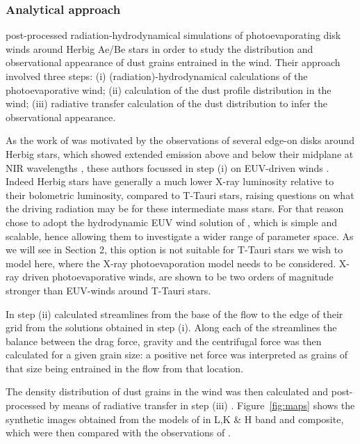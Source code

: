 \documentclass[10pt,fleqn,twoside]{article}
\begin{document}
\subsubsection{Analytical approach}\label{sec:analytical-approach}

\citet{2011MNRAS.411.1104O} post-processed
radiation-hydrodynamical simulations of photoevaporating disk winds
around Herbig Ae/Be stars in order to study the distribution and
observational appearance of dust grains entrained in the wind. Their
approach involved three steps: (i) (radiation)-hydrodynamical
calculations of the photoevaporative wind; (ii) calculation of the
dust profile distribution in the wind; (iii) radiative transfer
calculation of the dust distribution to infer the observational
appearance. 

As the work of \citet{2011MNRAS.411.1104O} was motivated by the
observations of several edge-on disks around Herbig stars, which
showed extended emission above and below their midplane at NIR
wavelengths \citep[e.g.,][]{1999AJ....117.1490P, 2006ApJ...645.1272P},
these
authors focussed in step (i)  on EUV-driven winds 
\citep[e.g.][]{1994ApJ...428..654H, 2004ApJ...607..890F, 
2006MNRAS.369..216A, 2006MNRAS.369..229A}. Indeed Herbig
stars have generally a much lower X-ray luminosity relative to their
bolometric luminosity, compared to T-Tauri stars, raising questions on
what the driving radiation may be for these intermediate mass stars. For
that reason \citet{2011MNRAS.411.1104O} chose to adopt the
hydrodynamic EUV wind solution of \citet{2004ApJ...607..890F},
which is simple and
scalable, hence allowing them to investigate a wider range of
parameter space. As we will see in Section 2, this option is not
suitable for T-Tauri stars we wish to model here, where the X-ray
photoevaporation model needs to be considered. X-ray driven
photoevaporative winds, are shown to be two orders of
magnitude stronger than EUV-winds around T-Tauri
stars. 

In step (ii) \citet{2011MNRAS.411.1104O} calculated streamlines
from the base of the flow to the edge of their grid from the solutions
obtained in step (i). Along each of the streamlines the balance
between the drag force, gravity and the centrifugal force was then
calculated for a given grain size: a positive net force was interpreted
as grains of that size being entrained in the flow from that
location. 

The density distribution of dust grains in the wind was
then calculated and post-processed by means of radiative
transfer in step (iii) . Figure~\ref{fig:maps} shows the synthetic images 
obtained from the models of \citet{2011MNRAS.411.1104O} in L,K \&
H band and composite, which were then compared 
with the observations of \citet{2006ApJ...645.1272P}. 
\end{document}
